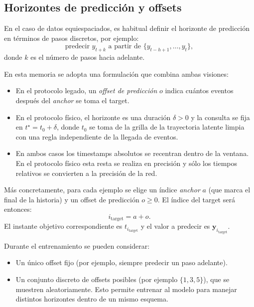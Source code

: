 \subsection{Horizontes de predicción y offsets}

En el caso de datos equiespaciados, es habitual definir el horizonte de predicción en términos de pasos discretos, por ejemplo:
\begin{equation}
    \text{predecir } y_{t+k} \text{ a partir de } \{y_{t-h+1}, \dots, y_{t}\},
\end{equation}
donde $k$ es el número de pasos hacia adelante.

En esta memoria se adopta una formulación que combina ambas visiones:
\begin{itemize}
    \item En el protocolo legado, un \textit{offset de predicción} $o$ indica cuántos eventos después del \emph{anchor} se toma el target.
    \item En el protocolo físico, el horizonte es una duración $\delta>0$ y la consulta se fija en $t^\star=t_0+\delta$, donde $t_0$ se toma de la grilla de la trayectoria latente limpia con una regla independiente de la llegada de eventos.
    \item En ambos casos los timestamps absolutos se recentran dentro de la ventana. En el protocolo físico esta resta se realiza en precisión  y sólo los tiempos relativos se convierten a la precisión de la red.
\end{itemize}

Más concretamente, para cada ejemplo se elige un índice \emph{anchor} $a$ (que marca el final de la historia) y un offset de predicción $o \ge 0$. El índice del target será entonces:
\begin{equation}
    i_{\text{target}} = a + o.
\end{equation}
El instante objetivo correspondiente es $t_{i_{\text{target}}}$ y el valor a predecir es $\mathbf{y}_{i_{\text{target}}}$.

\hfill

Durante el entrenamiento se pueden considerar:
\begin{itemize}
    \item Un único offset fijo (por ejemplo, siempre predecir un paso adelante).
    \item Un conjunto discreto de offsets posibles (por ejemplo $\{1, 3, 5\}$), que se muestren aleatoriamente. Esto permite entrenar al modelo para manejar distintos horizontes dentro de un mismo esquema.
\end{itemize}

